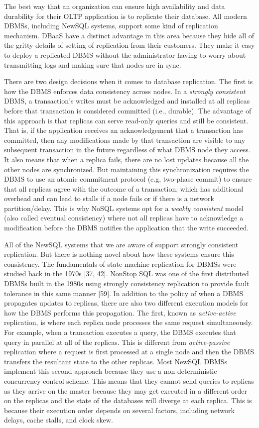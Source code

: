 \documentclass[a4paper,11pt,twoside,openright]{article}
\begin{document}
The best way that an organization can ensure high availability and data
durability for their OLTP application is to replicate their database.
All modern DBMSs, including NewSQL systems, support some kind of
replication mechanism. DBaaS have a distinct advantage in this area
because they hide all of the gritty details of setting of replication
from their customers. They make it easy to deploy a replicated DBMS
without the administrator having to worry about transmitting logs and
making sure that nodes are in sync.

There are two design decisions when it comes to database replication.
The first is how the DBMS enforces data consistency across nodes. In a
\emph{strongly consistent} DBMS, a transaction's writes must be
acknowledged and installed at all replicas before that transaction is
considered committed (i.e., durable). The advantage of this approach is
that replicas can serve read-only queries and still be consistent. That
is, if the application receives an acknowledgement that a transaction
has committed, then any modifications made by that transaction are
visible to any subsequent transaction in the future regardless of what
DBMS node they access. It also means that when a replica fails, there
are no lost updates because all the other nodes are synchronized. But
maintaining this synchronization requires the DBMS to use an atomic
commitment protocol (e.g, two-phase commit) to ensure that all replicas
agree with the outcome of a transaction, which has additional overhead
and can lead to stalls if a node fails or if there is a network
partition/delay. This is why NoSQL systems opt for a \emph{weakly
consistent} model (also called eventual consistency) where not all
replicas have to acknowledge a modification before the DBMS notifies the
application that the write succeeded.

All of the NewSQL systems that we are aware of support strongly
consistent replication. But there is nothing novel about how these
systems ensure this consistency. The fundamentals of state machine
replication for DBMSs were studied back in the 1970s {[}37, 42{]}.
NonStop SQL was one of the first distributed DBMSs built in the 1980s
using strongly consistency replication to provide fault tolerance in
this same manner {[}59{]}. In addition to the policy of when a DBMS
propagates updates to replicas, there are also two different execution
models for how the DBMS performs this propagation. The first, known as
\emph{active-active} replication, is where each replica node processes
the same request simultaneously. For example, when a transaction
executes a query, the DBMS executes that query in parallel at all of the
replicas. This is different from \emph{active-passive} replication where
a request is first processed at a single node and then the DBMS
transfers the resultant state to the other replicas. Most NewSQL DBMSs
implement this second approach because they use a non-deterministic
concurrency control scheme. This means that they cannot send queries to
replicas as they arrive on the master because they may get executed in a
different order on the replicas and the state of the databases will
diverge at each replica. This is because their execution order depends
on several factors, including network delays, cache stalls, and clock
skew.
\end{document}
